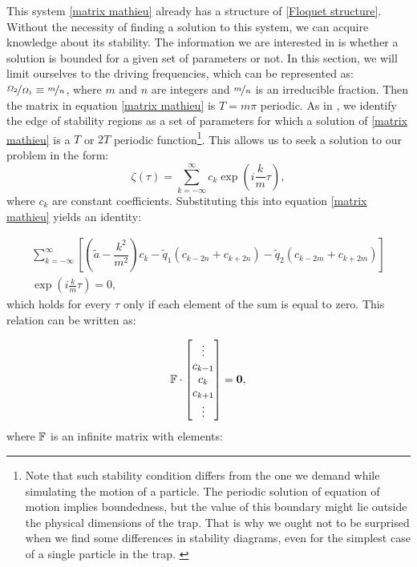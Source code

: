 This system \eqref{matrix mathieu} already has a structure of \eqref{Floquet structure}. Without the necessity of finding a solution to this system, we can acquire knowledge about its stability. The information we are interested in is whether a solution is bounded for a given set of parameters or not. In this section, we will limit ourselves to the driving frequencies, which can be represented as: $\nicefrac{\Omega_2}{\Omega_1} \equiv \nicefrac{m}{n}$, where $m$ and $n$ are integers and $\nicefrac{m}{n}$ is an irreducible fraction. Then the matrix in equation \eqref{matrix mathieu} is $T = m \pi$ periodic. As in \cite{leefer2017investigation}, we identify the edge of stability regions as a set of parameters for which a solution of \eqref{matrix mathieu} is a $T$ or $2T$ periodic function\footnote{Note that such stability condition differs from the one we demand while simulating the motion of a particle. The periodic solution of equation of motion implies boundedness, but the value of this boundary might lie outside the physical dimensions of the trap. That is why we ought not to be surprised when we find some differences in stability diagrams, even for the simplest case of a single particle in the trap. \label{foot:different stability condition}}. This allows us to seek a solution to our problem in the form:
\begin{equation}
	\label{Floquet ansatz}
	\zeta(\tau) = \sum_{k=-\infty}^{\infty} c_k \exp(i\frac{k}{m}\tau),
\end{equation}
where $c_k$ are constant coefficients. Substituting this into equation \eqref{matrix mathieu} yields an identity:

\begin{multline}
	\sum_{k=\minus\infty}^{\infty}\left[ \left(\tilde{a} \minus \dfrac{k^2}{m^2} \right)c_k \minus \tilde{q}_1 \left(c_{k-2n} + c_{k+2n} \right) \minus \tilde{q}_2 \left(c_{k-2m} + c_{k+2m} \right)  \right] \\ \exp(i\frac{k}{m}\tau) = 0,
\end{multline}
which holds for every $\tau$ only if each element of the sum is equal to zero. This relation can be written as:

\begin{equation}
	\label{Floquet edge eq}
	\mathbb{F} \cdot \begin{bmatrix}
	\vdots \\
	c_{k-1} \\
	c_{k} \\
	c_{k+1} \\
	\vdots
	\end{bmatrix} = \vb{0},
\end{equation}
where $\mathbb{F}$ is an infinite matrix with elements:

